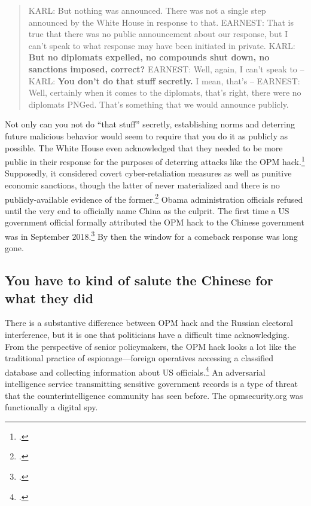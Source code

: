 \documentclass[11pt]{memoir}
\begin{document}
\begin{refsegment}
\begin{quote}
KARL: But nothing was announced. There was not a single step announced by the White House in response to that.
\newline \newline
EARNEST: That is true that there was no public announcement about our response, but I can't speak to what response may have been initiated in private.
\newline \newline
KARL: \textbf{But no diplomats expelled, no compounds shut down, no sanctions imposed, correct?}
\newline \newline
EARNEST: Well, again, I can't speak to --
\newline \newline
KARL: \textbf{You don't do that stuff secretly.}  I mean, that's --
\newline \newline
EARNEST: Well, certainly when it comes to the diplomats, that's right, there were no diplomats PNGed. That's something that we would announce publicly.
\end{quote}
Not only can you not do ``that stuff'' secretly, establishing norms and deterring future malicious behavior would seem to require that you do it as publicly as possible. The White House even acknowledged that they needed to be more public in their response for the purposes of deterring attacks like the OPM hack.\footcite{sanger_u.s._2016} Supposedly, it considered covert cyber-retaliation measures as well as punitive economic sanctions, though the latter of never materialized and there is no publicly-available evidence of the former.\footcite{nakashima_hacks_2015} Obama administration officials refused until the very end to officially name China as the culprit. The first time a US government official formally attributed the OPM hack to the Chinese government was in September 2018.\footcite{sanger_trump_2018} By then the window for a comeback response was long gone.

\subsection{You have to kind of salute the Chinese for what they did}
There is a substantive difference between OPM hack and the Russian electoral interference, but it is one that politicians have a difficult time acknowledging. From the perspective of senior policymakers, the OPM hack looks a lot like the traditional practice of espionage---foreign operatives accessing a classified database and collecting information about US officials.\footcite{nakashima_chinese_2015} An adversarial intelligence service transmitting sensitive government records is a type of threat that the counterintelligence community has seen before. The opmsecurity.org was functionally a digital spy.


\end{refsegment}
\end{document}
